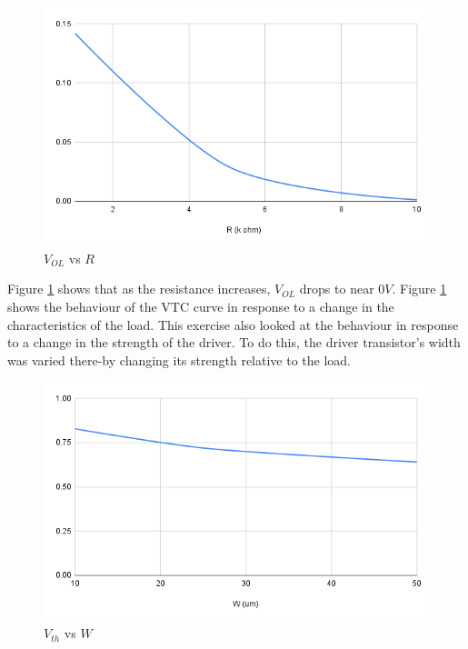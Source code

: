 \documentclass[CMPE]{../KGCOEReport}
\begin{document}
	\pagebreak
	
	\begin{figure}[h!]
		\centering
       \includegraphics[width=5.5in]{img/vol_vs_r}
       \caption{$V_{OL}$ vs $R$}
       \label{fig:vol_vs_r}
	 \end{figure}

	Figure \ref{fig:vol_vs_r} shows that as the resistance increases, $V_{OL}$
	drops to near $0V$. Figure \ref{fig:vol_vs_r} shows the behaviour of the
	VTC curve in response to a change in the characteristics of the load. This
	exercise also looked at the behaviour in response to a change in the strength
	of the driver. To do this, the driver transistor's width was varied there-by
	changing its strength relative to the load.
	
	\begin{figure}[h!]
		\centering
       \includegraphics[width=5.5in]{img/vth_vs_w}
       \caption{$V_{th}$ vs $W$}
       \label{fig:vol_vs_w}
	 \end{figure}
\end{document}
